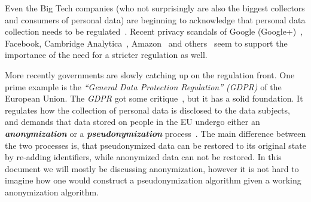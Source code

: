 Even the Big Tech companies (who not surprisingly are also the biggest collectors and consumers of personal data) are
beginning to acknowledge that personal data collection needs to be regulated~\cite{wired01}.
Recent privacy scandals of Google (Google+)~\cite{precursor01}, Facebook, Cambridge Analytica~\cite{wiki01}, Amazon~\cite{wiki02} and others~\cite{technadu01} seem to support the importance of the need for a stricter regulation as well.

More recently governments are slowly catching up on the regulation front.
One prime example is the \textit{``General Data Protection Regulation'' (GDPR)} of the European Union.
The \textit{GDPR} got some critique~\cite{clearcritique,thomsonreuters}, but it has a solid foundation.
It regulates how the collection of personal data is disclosed to the data subjects, and demands that data stored on people in the EU undergo either an \textbf{\textit{anonymization}} or a \textbf{\textit{pseudonymization}} process~\cite{wiki03, wiki04}.
The main difference between the two processes is, that pseudonymized data can be restored to its original state by re-adding identifiers, while anonymized data can not be restored.
In this document we will mostly be discussing anonymization, however it is not hard to imagine how one would construct a pseudonymization algorithm given a working anonymization algorithm.
